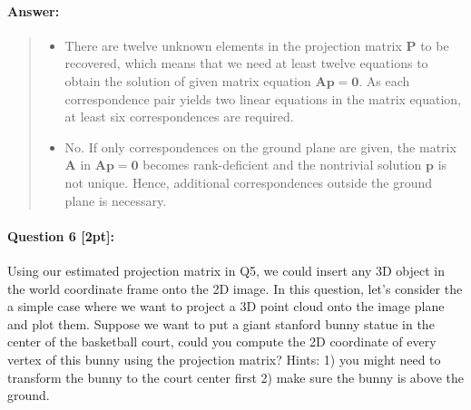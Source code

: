 \documentclass[11pt]{article}
\begin{document}
\begin{itemize}
\paragraph{Answer:} 
\begin{quote}
\begin{itemize}
    \item There are twelve unknown elements in the projection matrix $\mathbf{P}$ to be recovered, which means that we need at least twelve equations to obtain the solution of given matrix equation $\mathbf{A}\mathbf{p} = \mathbf{0}$. As each correspondence pair yields two linear equations in the matrix equation, at least six correspondences are required.
    \item No. If only correspondences on the ground plane are given, the matrix $\mathbf{A}$ in $\mathbf{A}\mathbf{p} = \mathbf{0}$ becomes rank-deficient and the nontrivial solution $\mathbf{p}$ is not unique. Hence, additional correspondences outside the ground plane is necessary.
\end{itemize}
\end{quote}

\end{itemize}

\paragraph{Question 6 [2pt]:}
Using our estimated projection matrix in Q5, we could insert any 3D object in the world coordinate frame onto the 2D image. In this question, let's consider the a simple case where we want to project a 3D point cloud onto the image plane and plot them. Suppose we want to put a giant stanford bunny statue in the center of the basketball court, could you compute the 2D coordinate of every vertex of this bunny using the projection matrix? Hints: 1) you might need to transform the bunny to the court center first 2) make sure the bunny is above the ground. 
\end{document}
